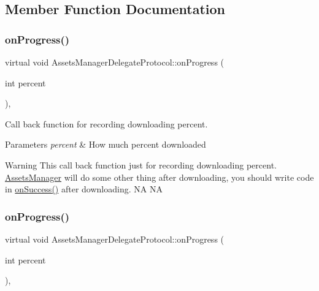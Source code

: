 \subsection{Member Function Documentation}
\mbox{\label{classAssetsManagerDelegateProtocol_ac72f8ce1d5af0aa8044352658033fb95}} 
\subsubsection{\texorpdfstring{on\+Progress()}{onProgress()}\hspace{0.1cm}{\footnotesize\ttfamily [1/2]}}
{\footnotesize\ttfamily virtual void Assets\+Manager\+Delegate\+Protocol\+::on\+Progress (\begin{DoxyParamCaption}\item[{int}]{percent }\end{DoxyParamCaption})\hspace{0.3cm}{\ttfamily [inline]}, {\ttfamily [virtual]}}



Call back function for recording downloading percent. 


\begin{DoxyParams}{Parameters}
{\em percent} & How much percent downloaded \\
\hline
\end{DoxyParams}
\begin{DoxyWarning}{Warning}
This call back function just for recording downloading percent. \hyperlink{classAssetsManager}{Assets\+Manager} will do some other thing after downloading, you should write code in \hyperlink{classAssetsManagerDelegateProtocol_a3a6c17217d8bf0437f411748e610acd9}{on\+Success()} after downloading.  NA  NA 
\end{DoxyWarning}
\mbox{\label{classAssetsManagerDelegateProtocol_ac72f8ce1d5af0aa8044352658033fb95}} 
\subsubsection{\texorpdfstring{on\+Progress()}{onProgress()}\hspace{0.1cm}{\footnotesize\ttfamily [2/2]}}
{\footnotesize\ttfamily virtual void Assets\+Manager\+Delegate\+Protocol\+::on\+Progress (\begin{DoxyParamCaption}\item[{int}]{percent }\end{DoxyParamCaption})\hspace{0.3cm}{\ttfamily [inline]}, {\ttfamily [virtual]}}



